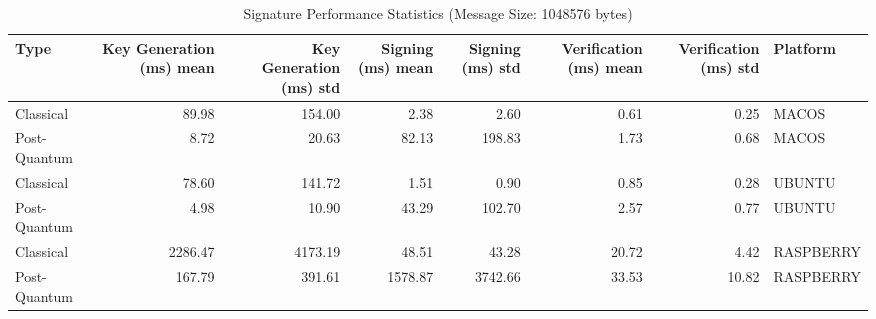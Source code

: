 \begin{table}
\caption{Signature Performance Statistics (Message Size: 1048576 bytes)}
\label{tab:sig_platform_stats_1048576}
\begin{tabular}{lrrrrrrl}
\toprule
Type & Key Generation (ms) mean & Key Generation (ms) std & Signing (ms) mean & Signing (ms) std & Verification (ms) mean & Verification (ms) std & Platform \\
\midrule
Classical & 89.98 & 154.00 & 2.38 & 2.60 & 0.61 & 0.25 & MACOS \\
Post-Quantum & 8.72 & 20.63 & 82.13 & 198.83 & 1.73 & 0.68 & MACOS \\
Classical & 78.60 & 141.72 & 1.51 & 0.90 & 0.85 & 0.28 & UBUNTU \\
Post-Quantum & 4.98 & 10.90 & 43.29 & 102.70 & 2.57 & 0.77 & UBUNTU \\
Classical & 2286.47 & 4173.19 & 48.51 & 43.28 & 20.72 & 4.42 & RASPBERRY \\
Post-Quantum & 167.79 & 391.61 & 1578.87 & 3742.66 & 33.53 & 10.82 & RASPBERRY \\
\bottomrule
\end{tabular}
\end{table}
